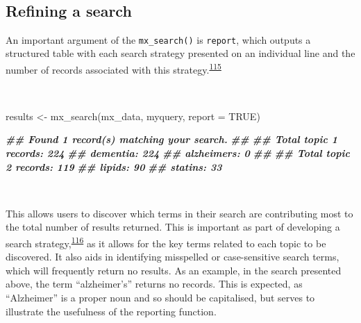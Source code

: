 \documentclass[a4paper, twoside]{templates/ociamthesis}
\newenvironment{Shaded}{\begin{snugshade}}{\end{snugshade}}
\newcommand{\AttributeTok}[1]{\textcolor[rgb]{0.77,0.63,0.00}{#1}}
\newcommand{\ConstantTok}[1]{\textcolor[rgb]{0.00,0.00,0.00}{#1}}
\newcommand{\DocumentationTok}[1]{\textcolor[rgb]{0.56,0.35,0.01}{\textbf{\textit{#1}}}}
\newcommand{\FunctionTok}[1]{\textcolor[rgb]{0.00,0.00,0.00}{#1}}
\newcommand{\NormalTok}[1]{#1}
\newcommand{\OtherTok}[1]{\textcolor[rgb]{0.56,0.35,0.01}{#1}}
\renewenvironment{Shaded}
{
  \vspace{4pt}%
  \begin{snugshade}%
}{%
  \end{snugshade}%
  \vspace{4pt}%
}
\begin{document}
~

\hypertarget{refining-a-search}{%
\subsection{Refining a search}\label{refining-a-search}}

An important argument of the \texttt{mx\_search()} is \texttt{report}, which outputs a structured table with each search strategy presented on an individual line and the number of records associated with this strategy.\textsuperscript{\protect\hyperlink{ref-rethlefsen2021prisma}{115}}

~

\begin{Shaded}
\begin{Highlighting}[]
\NormalTok{results  }\OtherTok{\textless{}{-}} \FunctionTok{mx\_search}\NormalTok{(mx\_data,}
\NormalTok{                      myquery,}
                      \AttributeTok{report =} \ConstantTok{TRUE}\NormalTok{)}
\end{Highlighting}
\end{Shaded}

\begin{Shaded}
\begin{Highlighting}[]
\DocumentationTok{\#\# Found 1 record(s) matching your search.}
\DocumentationTok{\#\# }
\DocumentationTok{\#\# Total topic 1 records: 224}
\DocumentationTok{\#\# dementia: 224}
\DocumentationTok{\#\# alzheimer\textquotesingle{}s: 0}
\DocumentationTok{\#\# }
\DocumentationTok{\#\# Total topic 2 records: 119}
\DocumentationTok{\#\# lipids: 90}
\DocumentationTok{\#\# statins: 33}
\end{Highlighting}
\end{Shaded}

~

This allows users to discover which terms in their search are contributing most to the total number of results returned. This is important as part of developing a search strategy,\textsuperscript{\protect\hyperlink{ref-bramer2018}{116}} as it allows for the key terms related to each topic to be discovered. It also aids in identifying misspelled or case-sensitive search terms, which will frequently return no results. As an example, in the search presented above, the term ``alzheimer's'' returns no records. This is expected, as ``Alzheimer'' is a proper noun and so should be capitalised, but serves to illustrate the usefulness of the reporting function.

~
\end{document}
